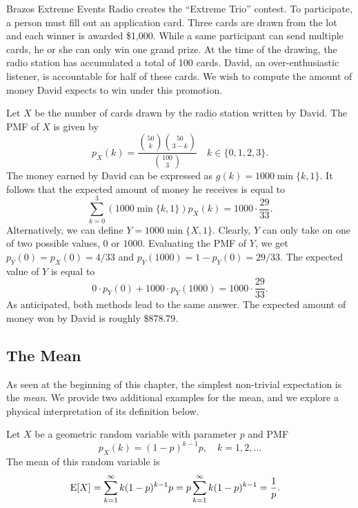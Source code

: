 \begin{example}
Brazos Extreme Events Radio creates the ``Extreme Trio'' contest.
To participate, a person must fill out an application card.
Three cards are drawn from the lot and each winner is awarded \$1,000.
While a same participant can send multiple cards, he or she can only win one grand prize.
At the time of the drawing, the radio station has accumulated a total of 100 cards.
David, an over-enthusiastic listener, is accountable for half of these cards.
We wish to compute the amount of money David expects to win under this promotion.

Let $X$ be the number of cards drawn by the radio station written by David.
The PMF of $X$ is given by
\begin{equation*}
p_X(k) = \frac{\binom{50}{k} \binom{50}{3-k}}{\binom{100}{3}}
\quad k \in \{ 0, 1, 2, 3 \}.
\end{equation*}
The money earned by David can be expressed as $g(k) = 1000 \min \{ k,1 \}$.
It follows that the expected amount of money he receives is equal to
\begin{equation*}
\sum_{k=0}^3 \left( 1000 \min \{ k, 1 \} \right) p_X(k)
= 1000 \cdot \frac{29}{33} .
\end{equation*}
Alternatively, we can define $Y = 1000 \min \{ X, 1 \}$.
Clearly, $Y$ can only take on one of two possible values, $0$ or $1000$.
Evaluating the PMF of $Y$, we get $p_Y(0) = p_X(0) = 4/33$ and $p_Y(1000) = 1 - p_Y(0) = 29/33$.
The expected value of $Y$ is equal to
\begin{equation*}
0 \cdot p_Y(0) + 1000 \cdot p_Y(1000) = 1000 \cdot \frac{29}{33} .
\end{equation*}
As anticipated, both methods lead to the same answer.
The expected amount of money won by David is roughly \$878.79.
\end{example}


\subsection{The Mean}

As seen at the beginning of this chapter, the simplest non-trivial expectation is the \emph{mean}.  
We provide two additional examples for the mean, and we explore a physical interpretation of its definition below.

\begin{example}
Let $X$ be a geometric random variable with parameter $p$ and PMF
\begin{equation*}
p_X (k) = (1-p)^{k-1} p, \quad k = 1, 2, \ldots
\end{equation*}
The mean of this random variable is
\begin{equation*}
\begin{split}
\mathrm{E} [X] &= \sum_{k=1}^{\infty} k (1-p)^{k-1} p
= p \sum_{k=1}^{\infty} k (1-p)^{k-1}
= \frac{1}{p} .
\end{split}
\end{equation*}
\end{example}

